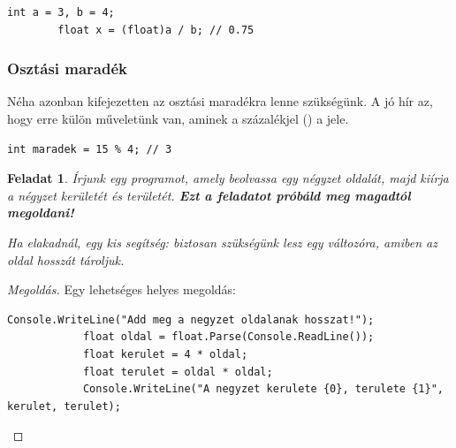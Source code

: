 \documentclass[a4paper]{article}
\newtheorem{ex}[thm]{Feladat} %
\newenvironment{solution} {\begin{proof}[Megoldás]} {\end{proof}}
\begin{document}
	\begin{lstlisting}[caption=Tört osztása \lstinline{floart}-tá alakítással, label=lst:divFloatCast]
		int a = 3, b = 4;
		float x = (float)a / b; // 0.75
	\end{lstlisting}
	
	\subsubsection{Osztási maradék}
	Néha azonban kifejezetten az osztási maradékra lenne szükségünk. A jó hír az, hogy erre külön műveletünk van, aminek a százalékjel (\within{\lstinline{\%}}) a jele.
	
	\begin{lstlisting}[caption=Osztási maradék, label=lst:divRem]
		int maradek = 15 % 4; // 3
	\end{lstlisting}
	
	\begin{ex}
		Írjunk egy programot, amely beolvassa egy négyzet oldalát, majd kiírja a négyzet kerületét és területét.
		\textbf{Ezt a feladatot próbáld meg magadtól megoldani!}
		
		Ha elakadnál, egy kis segítség: biztosan szükségünk lesz egy változóra, amiben az oldal hosszát tároljuk.
	\end{ex}
	
	\begin{solution}
		Egy lehetséges helyes megoldás:
		
		\begin{lstlisting}[caption=Négyzet kerülete és területe, label=lst:slnSquare]
			Console.WriteLine("Add meg a negyzet oldalanak hosszat!");
			float oldal = float.Parse(Console.ReadLine());
			float kerulet = 4 * oldal;
			float terulet = oldal * oldal;
			Console.WriteLine("A negyzet kerulete {0}, terulete {1}", kerulet, terulet);
		\end{lstlisting}
	\end{solution}
	
\end{document}
